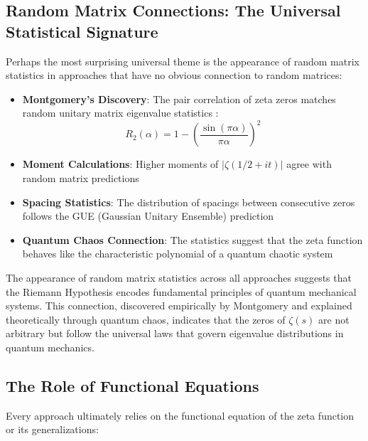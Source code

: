 \subsection{Random Matrix Connections: The Universal Statistical Signature}
\label{subsec:random_matrix_universal}

Perhaps the most surprising universal theme is the appearance of random matrix statistics in approaches that have no obvious connection to random matrices:

\begin{itemize}
\item \textbf{Montgomery's Discovery}: The pair correlation of zeta zeros matches random unitary matrix eigenvalue statistics \cite{montgomery1973}:
\begin{equation}
R_2(\alpha) = 1 - \left(\frac{\sin(\pi \alpha)}{\pi \alpha}\right)^2
\end{equation}

\item \textbf{Moment Calculations}: Higher moments of $|\zeta(1/2 + it)|$ agree with random matrix predictions \cite{keatingsaith2000}

\item \textbf{Spacing Statistics}: The distribution of spacings between consecutive zeros follows the GUE (Gaussian Unitary Ensemble) prediction

\item \textbf{Quantum Chaos Connection}: The statistics suggest that the zeta function behaves like the characteristic polynomial of a quantum chaotic system
\end{itemize}

\begin{insight}
The appearance of random matrix statistics across all approaches suggests that the Riemann Hypothesis encodes fundamental principles of quantum mechanical systems. This connection, discovered empirically by Montgomery and explained theoretically through quantum chaos, indicates that the zeros of $\zeta(s)$ are not arbitrary but follow the universal laws that govern eigenvalue distributions in quantum mechanics.
\end{insight}

\subsection{The Role of Functional Equations}
\label{subsec:functional_equations}

Every approach ultimately relies on the functional equation of the zeta function or its generalizations:

